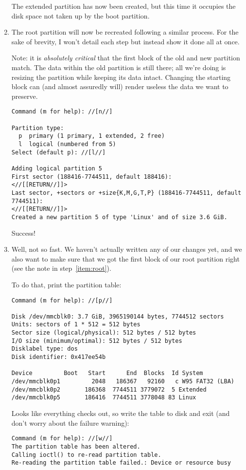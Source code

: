 \documentclass[12pt,letterpaper]{article}
\begin{document}
\begin{enumerate}
The extended partition has now been created, but this time it occupies the disk space not taken up by the boot partition.

\item \label{item:root} The root partition will now be recreated following a similar process.  For the sake of brevity, I won't detail each step but instead show it done all at once.

Note: it is \emph{absolutely critical} that the first block of the old and new partition match.  The data within the old partition is still there; all we're doing is resizing the partition while keeping its data intact.  Changing the starting block can (and almost assuredly will) render useless the data we want to preserve.
\begin{lstlisting}
Command (m for help): //[n//]

Partition type:
  p  primary (1 primary, 1 extended, 2 free)
  l  logical (numbered from 5)
Select (default p): //[l//]

Adding logical partition 5
First sector (188416-7744511, default 188416):
<//[[RETURN//]]>
Last sector, +sectors or +size{K,M,G,T,P} (188416-7744511, default 7744511):
<//[[RETURN//]]>
Created a new partition 5 of type 'Linux' and of size 3.6 GiB.
\end{lstlisting}
Success!

\item Well, not so fast.  We haven't actually written any of our changes yet, and we also want to make sure that we got the first block of our root partition right (see the note in step~\ref{item:root}).

To do that, print the partition table:
\begin{lstlisting}[basicstyle=\ttfamily\footnotesize]
Command (m for help): //[p//]

Disk /dev/mmcblk0: 3.7 GiB, 3965190144 bytes, 7744512 sectors
Units: sectors of 1 * 512 = 512 bytes
Sector size (logical/physical): 512 bytes / 512 bytes
I/O size (minimum/optimal): 512 bytes / 512 bytes
Disklabel type: dos
Disk identifier: 0x417ee54b

Device         Boot   Start      End  Blocks  Id System
/dev/mmcblk0p1         2048   186367   92160   c W95 FAT32 (LBA)
/dev/mmcblk0p2       186368  7744511 3779072  5 Extended
/dev/mmcblk0p5       186416  7744511 3778048 83 Linux
\end{lstlisting}
Looks like everything checks out, so %
write the table to disk and exit (and don't worry about the failure warning):
\begin{lstlisting}
Command (m for help): //[w//]
The partition table has been altered.
Calling ioctl() to re-read partition table.
Re-reading the partition table failed.: Device or resource busy


\end{lstlisting}
\end{enumerate}
\end{document}
